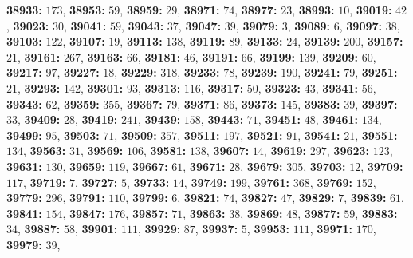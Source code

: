\textsf{\bfseries 38933:} $173$, \textsf{\bfseries 38953:} $59$, \textsf{\bfseries 38959:} $29$, \textsf{\bfseries 38971:} $74$, \textsf{\bfseries 38977:} $23$, \textsf{\bfseries 38993:} $10$, \textsf{\bfseries 39019:} $42$, \textsf{\bfseries 39023:} $30$, \textsf{\bfseries 39041:} $59$, \textsf{\bfseries 39043:} $37$, \textsf{\bfseries 39047:} $39$, \textsf{\bfseries 39079:} $3$, \textsf{\bfseries 39089:} $6$, \textsf{\bfseries 39097:} $38$, \textsf{\bfseries 39103:} $122$, \textsf{\bfseries 39107:} $19$, \textsf{\bfseries 39113:} $138$, \textsf{\bfseries 39119:} $89$, \textsf{\bfseries 39133:} $24$, \textsf{\bfseries 39139:} $200$, \textsf{\bfseries 39157:} $21$, \textsf{\bfseries 39161:} $267$, \textsf{\bfseries 39163:} $66$, \textsf{\bfseries 39181:} $46$, \textsf{\bfseries 39191:} $66$, \textsf{\bfseries 39199:} $139$, \textsf{\bfseries 39209:} $60$, \textsf{\bfseries 39217:} $97$, \textsf{\bfseries 39227:} $18$, \textsf{\bfseries 39229:} $318$, \textsf{\bfseries 39233:} $78$, \textsf{\bfseries 39239:} $190$, \textsf{\bfseries 39241:} $79$, \textsf{\bfseries 39251:} $21$, \textsf{\bfseries 39293:} $142$, \textsf{\bfseries 39301:} $93$, \textsf{\bfseries 39313:} $116$, \textsf{\bfseries 39317:} $50$, \textsf{\bfseries 39323:} $43$, \textsf{\bfseries 39341:} $56$, \textsf{\bfseries 39343:} $62$, \textsf{\bfseries 39359:} $355$, \textsf{\bfseries 39367:} $79$, \textsf{\bfseries 39371:} $86$, \textsf{\bfseries 39373:} $145$, \textsf{\bfseries 39383:} $39$, \textsf{\bfseries 39397:} $33$, \textsf{\bfseries 39409:} $28$, \textsf{\bfseries 39419:} $241$, \textsf{\bfseries 39439:} $158$, \textsf{\bfseries 39443:} $71$, \textsf{\bfseries 39451:} $48$, \textsf{\bfseries 39461:} $134$, \textsf{\bfseries 39499:} $95$, \textsf{\bfseries 39503:} $71$, \textsf{\bfseries 39509:} $357$, \textsf{\bfseries 39511:} $197$, \textsf{\bfseries 39521:} $91$, \textsf{\bfseries 39541:} $21$, \textsf{\bfseries 39551:} $134$, \textsf{\bfseries 39563:} $31$, \textsf{\bfseries 39569:} $106$, \textsf{\bfseries 39581:} $138$, \textsf{\bfseries 39607:} $14$, \textsf{\bfseries 39619:} $297$, \textsf{\bfseries 39623:} $123$, \textsf{\bfseries 39631:} $130$, \textsf{\bfseries 39659:} $119$, \textsf{\bfseries 39667:} $61$, \textsf{\bfseries 39671:} $28$, \textsf{\bfseries 39679:} $305$, \textsf{\bfseries 39703:} $12$, \textsf{\bfseries 39709:} $117$, \textsf{\bfseries 39719:} $7$, \textsf{\bfseries 39727:} $5$, \textsf{\bfseries 39733:} $14$, \textsf{\bfseries 39749:} $199$, \textsf{\bfseries 39761:} $368$, \textsf{\bfseries 39769:} $152$, \textsf{\bfseries 39779:} $296$, \textsf{\bfseries 39791:} $110$, \textsf{\bfseries 39799:} $6$, \textsf{\bfseries 39821:} $74$, \textsf{\bfseries 39827:} $47$, \textsf{\bfseries 39829:} $7$, \textsf{\bfseries 39839:} $61$, \textsf{\bfseries 39841:} $154$, \textsf{\bfseries 39847:} $176$, \textsf{\bfseries 39857:} $71$, \textsf{\bfseries 39863:} $38$, \textsf{\bfseries 39869:} $48$, \textsf{\bfseries 39877:} $59$, \textsf{\bfseries 39883:} $34$, \textsf{\bfseries 39887:} $58$, \textsf{\bfseries 39901:} $111$, \textsf{\bfseries 39929:} $87$, \textsf{\bfseries 39937:} $5$, \textsf{\bfseries 39953:} $111$, \textsf{\bfseries 39971:} $170$, \textsf{\bfseries 39979:} $39$, 
